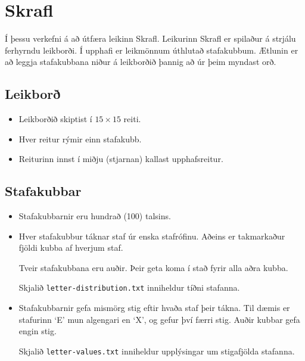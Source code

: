 \documentclass[12pt,a4paper]{article}
\begin{document}
\clearpage

\section*{Skrafl}

Í þessu verkefni á að útfæra leikinn Skrafl. Leikurinn Skrafl er spilaður á strjálu ferhyrndu leikborði. Í upphafi er leikmönnum úthlutað stafakubbum. Ætlunin er að leggja stafakubbana niður á leikborðið þannig að úr þeim myndast orð.

\subsection*{Leikborð}

\begin{itemize}

	\item Leikborðið skiptist í $15 \times 15$ reiti.

	\item Hver reitur rýmir einn stafakubb.

	\item Reiturinn innst í miðju (stjarnan) kallast upphafsreitur.

\end{itemize}

\subsection*{Stafakubbar}

\begin{itemize}

	\item Stafakubbarnir eru hundrað (100) talsins.

	\item Hver stafakubbur táknar staf úr enska stafrófinu. Aðeins er takmarkaður fjöldi kubba af hverjum staf.

	Tveir stafakubbana eru auðir. Þeir geta koma í stað fyrir alla aðra kubba.

	Skjalið \texttt{letter-distribution.txt} inniheldur tíðni stafanna.

	\item Stafakubbarnir gefa mismörg stig eftir hvaða staf þeir tákna. Til dæmis er stafurinn `E' mun algengari en `X', og gefur því færri stig. Auðir kubbar gefa engin stig.

	Skjalið \texttt{letter-values.txt} inniheldur upplýsingar um stigafjölda stafanna.

\end{itemize}
\end{document}
